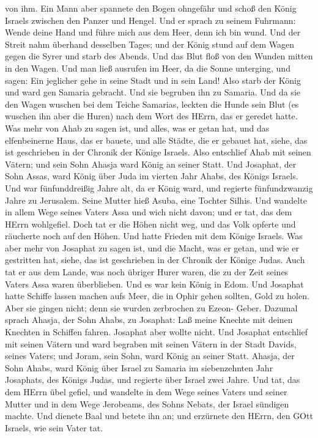 von ihm.  Ein Mann aber spannete den Bogen ohngefähr und
schoß den König Israels zwischen den Panzer und Hengel. Und er sprach zu
seinem Fuhrmann: Wende deine Hand und führe mich aus dem Heer, denn ich
bin wund.  Und der Streit nahm überhand desselben Tages;
und der König stund auf dem Wagen gegen die Syrer und starb des Abends.
Und das Blut floß von den Wunden mitten in den Wagen.  Und
man ließ ausrufen im Heer, da die Sonne unterging, und sagen: Ein
jeglicher gehe in seine Stadt und in sein Land!  Also starb
der König und ward gen Samaria gebracht. Und sie begruben ihn zu
Samaria.  Und da sie den Wagen wuschen bei dem Teiche
Samarias, leckten die Hunde sein Blut (es wuschen ihn aber die Huren)
nach dem Wort des HErrn, das er geredet hatte.  Was mehr
von Ahab zu sagen ist, und alles, was er getan hat, und das
elfenbeinerne Haus, das er bauete, und alle Städte, die er gebauet hat,
siehe, das ist geschrieben in der Chronik der Könige Israels.
 Also entschlief Ahab mit seinen Vätern; und sein Sohn
Ahasja ward König an seiner Statt.  Und Josaphat, der Sohn
Assas, ward König über Juda im vierten Jahr Ahabs, des Königs Israels.
 Und war fünfunddreißig Jahre alt, da er König ward, und
regierte fünfundzwanzig Jahre zu Jerusalem. Seine Mutter hieß Asuba,
eine Tochter Silhis.  Und wandelte in allem Wege seines
Vaters Assa und wich nicht davon; und er tat, das dem HErrn wohlgefiel.
 Doch tat er die Höhen nicht weg, und das Volk opferte und
räucherte noch auf den Höhen.  Und hatte Frieden mit dem
Könige Israels.  Was aber mehr von Josaphat zu sagen ist,
und die Macht, was er getan, und wie er gestritten hat, siehe, das ist
geschrieben in der Chronik der Könige Judas.  Auch tat er
aus dem Lande, was noch übriger Hurer waren, die zu der Zeit seines
Vaters Assa waren überblieben.  Und es war kein König in
Edom.  Und Josaphat hatte Schiffe lassen machen aufs Meer,
die in Ophir gehen sollten, Gold zu holen. Aber sie gingen nicht; denn
sie wurden zerbrochen zu Ezeon- Geber.  Dazumal sprach
Ahasja, der Sohn Ahabs, zu Josaphat: Laß meine Knechte mit deinen
Knechten in Schiffen fahren. Josaphat aber wollte nicht. 
Und Josaphat entschlief mit seinen Vätern und ward begraben mit seinen
Vätern in der Stadt Davids, seines Vaters; und Joram, sein Sohn, ward
König an seiner Statt.  Ahasja, der Sohn Ahabs, ward König
über Israel zu Samaria im siebenzehnten Jahr Josaphats, des Königs
Judas, und regierte über Israel zwei Jahre.  Und tat, das
dem HErrn übel gefiel, und wandelte in dem Wege seines Vaters und seiner
Mutter und in dem Wege Jerobeams, des Sohns Nebats, der Israel sündigen
machte.  Und dienete Baal und betete ihn an; und erzürnete
den HErrn, den GOtt Israels, wie sein Vater tat.
